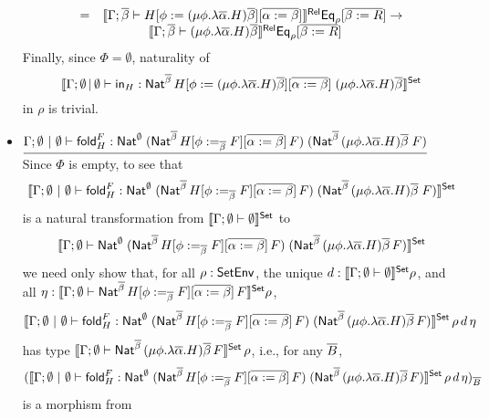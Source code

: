 \documentclass{lmcs}
\theoremstyle{plain}\newtheorem{satz}[thm]{Satz}
\newcommand{\fold}{\mathsf{fold}}
\begin{document}
\begin{itemize}
\[\begin{array}{ll}
= &
 \llbracket{\Gamma;\overline{\beta} \vdash H[\phi := (\mu
    \phi.\lambda {\overline \alpha}.H){\overline \beta}][\overline{\alpha :=
      \beta}]}\rrbracket^{\mathsf{Rel}}\mathsf{Eq}_\rho[\overline{\beta := R}]\to\\
 & \hspace*{0.5in} \llbracket{\Gamma;\overline{\beta} \vdash (\mu
  \phi.\lambda \overline{\alpha}.H)\overline{\beta}}\rrbracket^{\mathsf{Rel}} \mathsf{Eq}_\rho[\overline{\beta:=
    R}]
\end{array}\]
Finally, since $\Phi = \emptyset$, naturality of
\[
\llbracket{\Gamma;\emptyset \,|\, \emptyset \vdash \mathsf{in}_H :
  \mathsf{Nat}^{\overline{\beta}} \, H[\phi := (\mu \phi.\lambda
    {\overline \alpha}.H){\overline \beta}][\overline{\alpha := \beta}]
  \;(\mu \phi.\lambda {\overline \alpha}.H){\overline \beta}}\rrbracket^{\mathsf{Set}}
\]
in $\rho$ is trivial.

\item
$\underline{\Gamma; \emptyset~|~\emptyset \vdash \fold^F_H :
  \Nat^\emptyset\;(\Nat^{\ol{\beta}}\,H[\phi
    :=_{\ol{\beta}} F][\ol{\alpha := \beta}]\,F)\;
  (\Nat^{{\ol{\beta}} }\,(\mu \phi.\lambda \overline
  \alpha.H)\overline \beta \;F)}$ \; Since $\Phi$ is empty, to see
  that 
  $$\setsem{ \Gamma; \emptyset~|~\emptyset \vdash \fold^F_H :
    \Nat^\emptyset\;(\Nat^{\ol{\beta}}\,H[\phi
      :=_{\ol{\beta}} F][\ol{\alpha := \beta}]\,F)\;
    (\Nat^{{\ol{\beta}} }\,(\mu \phi.\lambda \overline
    \alpha.H)\overline \beta \;F)}$$
    is a natural transformation from
  $\llbracket{\Gamma;\emptyset \vdash \emptyset}\rrbracket^{\mathsf{Set}}$ to \[\llbracket{\Gamma;
    \emptyset \vdash \mathsf{Nat}^\emptyset\;(\mathsf{Nat}^{\overline{\beta}}\,H[\phi
      :=_{\overline{\beta}} F][\overline{\alpha := 
        \beta}]\,F)\; (\mathsf{Nat}^{{\overline{\beta}} }\,(\mu
    \phi.\lambda \overline \alpha.H)\overline \beta\,F)}\rrbracket^{\mathsf{Set}}\] we need only
  show that, for all $\rho : \mathsf{SetEnv}$, the unique $d :
  \llbracket{\Gamma;\emptyset \vdash \emptyset}\rrbracket^{\mathsf{Set}} \rho$, and all $\eta :
  \llbracket{\Gamma; \emptyset \vdash \mathsf{Nat}^{\overline{\beta}}\,H[\phi
      :=_{\overline{\beta}} F][\overline{\alpha := 
        \beta}]\,F}\rrbracket^{\mathsf{Set}} \rho$,
\[ \setsem{\Gamma; \emptyset~|~\emptyset \vdash \fold^F_H :
  \Nat^\emptyset\;(\Nat^{\ol{\beta}}\,H[\phi
    :=_{\ol{\beta}} F][\ol{\alpha := \beta}]\,F)\;
  (\Nat^{{\ol{\beta}} }\,(\mu \phi.\lambda \overline
  \alpha.H)\overline \beta\,F)}\,\rho\,d\,\eta\] has type
$\llbracket{\Gamma; \emptyset \vdash \mathsf{Nat}^{{\overline{\beta}}
  }\,(\mu \phi.\lambda \overline \alpha.H)\overline \beta\,F}\rrbracket^{\mathsf{Set}}\,\rho$,
i.e., for any $\overline{B}$,
\[(\setsem{\Gamma; \emptyset~|~\emptyset \vdash \fold^F_H :
  \Nat^\emptyset\;(\Nat^{\ol{\beta}}\,H[\phi :=_{\ol{\beta}}
    F][\ol{\alpha := \beta}]\,F)\; (\Nat^{{\ol{\beta}} }\,(\mu
  \phi.\lambda \overline \alpha.H)\overline
  \beta\,F)}\,\rho\,d\,\eta)_{\ol{B}}\] is a morphism from

\end{itemize}
\end{document}
